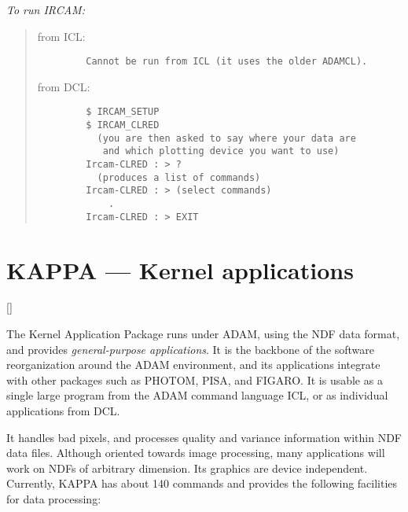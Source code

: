 {\em To run IRCAM:}\hfill
\begin{quote}
\begin{description}

\item [from ICL:]\hfill

\begin{small}
\begin{verbatim}
   Cannot be run from ICL (it uses the older ADAMCL).
\end{verbatim}
\end{small}

\item [from DCL:]\hfill

\begin{small}
\begin{verbatim}
   $ IRCAM_SETUP
   $ IRCAM_CLRED
     (you are then asked to say where your data are
      and which plotting device you want to use)
   Ircam-CLRED : > ?
     (produces a list of commands)
   Ircam-CLRED : > (select commands)
       .
   Ircam-CLRED : > EXIT
\end{verbatim}
\end{small}

\end{description}
\end{quote}

\newpage

\section{KAPPA --- Kernel applications}

\vspace{-11mm}

\hfill []

\vspace{5mm}

The Kernel Application Package runs under ADAM, using the NDF data format, and
provides {\em general-purpose applications}.
It is the backbone of the software reorganization around the ADAM environment,
and its applications integrate with other packages such as PHOTOM, PISA, and
FIGARO.
It is usable as a single large program from the ADAM command language ICL, or
as individual applications from DCL.

It handles bad pixels, and processes quality and variance information within
NDF data files.
Although oriented towards image processing, many applications will work on
NDFs of arbitrary dimension.
Its graphics are device independent.
Currently, KAPPA has about 140 commands and provides the following facilities
for data processing:

